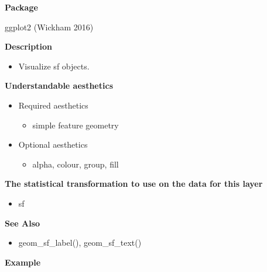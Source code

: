 \documentclass[
  letterpaper,
  DIV=11,
  numbers=noendperiod]{scrreprt}
\providecommand{\tightlist}{%
  \setlength{\itemsep}{0pt}\setlength{\parskip}{0pt}}\usepackage{longtable,booktabs,array}
\begin{document}
\textbf{Package}

ggplot2 (Wickham 2016)

\textbf{Description}

\begin{itemize}
\tightlist
\item
  Visualize sf objects.
\end{itemize}

\textbf{Understandable aesthetics}

\begin{itemize}
\tightlist
\item
  Required aesthetics

  \begin{itemize}
  \tightlist
  \item
    simple feature geometry
  \end{itemize}
\item
  Optional aesthetics

  \begin{itemize}
  \tightlist
  \item
    alpha, colour, group, fill
  \end{itemize}
\end{itemize}

\textbf{The statistical transformation to use on the data for this
layer}

\begin{itemize}
\tightlist
\item
  sf
\end{itemize}

\textbf{See Also}

\begin{itemize}
\tightlist
\item
  geom\_sf\_label(), geom\_sf\_text()
\end{itemize}

\textbf{Example}
\end{document}
